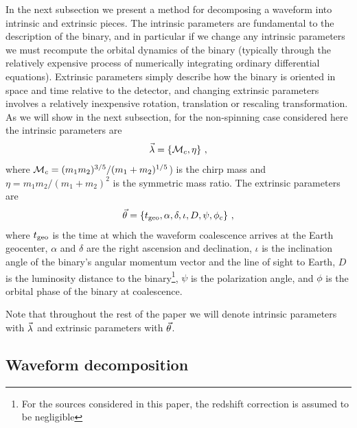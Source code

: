 In the next subsection we present a method for decomposing a waveform into intrinsic and extrinsic pieces.
The intrinsic parameters are fundamental to the description of the binary, and in particular if we change any intrinsic
parameters we must recompute the orbital dynamics of the binary (typically through the relatively expensive process
of numerically integrating ordinary differential equations). Extrinsic parameters simply describe how the
binary is oriented in space and time relative to the detector, and changing extrinsic parameters involves a 
relatively inexpensive rotation, translation or rescaling transformation. As we will show in the next subsection, 
for the non-spinning case considered here the intrinsic parameters are
\begin{equation} \label{eq:intrinsic}
\vec{\lambda}=\{{{\cal M}_c},\eta\}\ ,
\end{equation}
where ${{\cal M}_c} = (m_1m_2)^{3/5}/(m_1+m_2)^{1/5}$) is the chirp mass and 
$\eta = m_1m_2/(m_1+m_2)^2$ is the symmetric mass ratio.
The extrinsic parameters are
\begin{equation} \label{eq:extrinsic}
\vec{\theta}=\{t_{\rm geo},\alpha,\delta,\iota,D,\psi,\phi_c\}\ ,
\end{equation}
where $t_{\rm geo}$ is the time at which the waveform coalescence arrives at the Earth geocenter,
$\alpha$ and $\delta$ are the right ascension and declination, 
$\iota$ is the inclination angle of the binary's angular momentum vector and the line of sight to Earth, 
$D$ is the luminosity distance to the binary\footnote{For the sources considered in this paper, 
	the redshift correction is assumed to be negligible}, 
$\psi$ is the polarization angle, and $\phi$ is the orbital phase of the binary at coalescence.

Note that throughout the rest of the paper we will denote intrinsic parameters with $\vec{\lambda}$ 
and extrinsic parameters with $\vec{\theta}$.

\subsection{Waveform decomposition}


